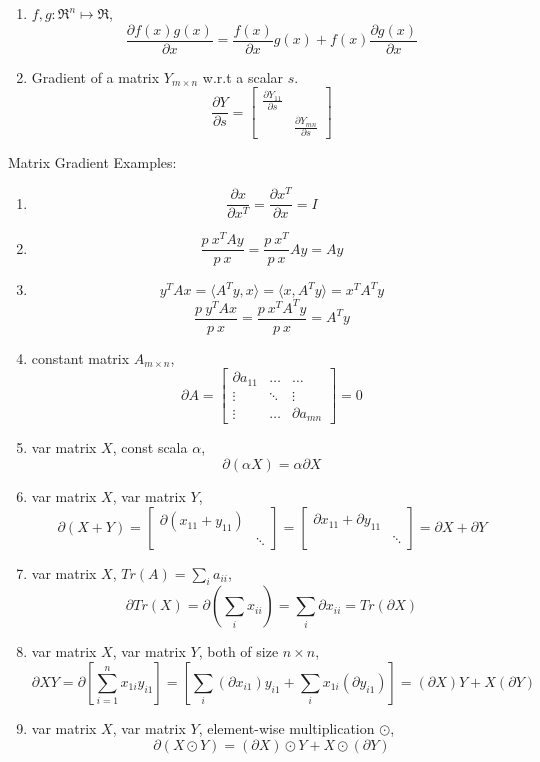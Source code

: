 
 \begin{enumerate}
	\item $f,g: \Re^n \mapsto \Re$,
		$$\frac{\partial f(x)g(x)}{\partial x}=
		 \frac{f(x)}{\partial x}g(x) + f(x)\frac{\partial g(x)}{\partial x}$$
	\item Gradient of a matrix $Y_{m\times n}$ w.r.t a scalar $s$.
$$\frac{\partial Y}{\partial s} =
		 \begin{bmatrix} \frac{\partial Y_{11}}{\partial s} & \\ & \frac{\partial Y_{mn}}{\partial s} \end{bmatrix}$$
 \end{enumerate}

 Matrix Gradient Examples:
 \begin{enumerate}
	 \item $$\frac{\partial x}{\partial x^T} =
		 \frac{\partial x^T}{\partial x} = I$$
	 \item $$\frac{p~x^TAy}{p~x} = \frac{p~x^T}{p~x}Ay = Ay$$
	 \item $$y^TAx = \langle A^Ty,x \rangle =
		 \langle x,A^Ty \rangle = x^TA^Ty$$
		 $$\frac{p~y^TAx}{p~x} = \frac{p~x^TA^Ty}{p~x} = A^Ty$$
	\item constant matrix $A_{m\times n}$,
		$$\partial A = \begin{bmatrix}
			\partial a_{11} & \ldots & \ldots \\
			\vdots & \ddots & \vdots \\
			\vdots & \ldots & \partial a_{mn}
		\end{bmatrix} = 0$$
	\item var matrix $X$, const scala $\alpha$,
		$$ \partial(\alpha X) = \alpha \partial X$$
	\item var matrix $X$, var matrix $Y$,
		$$ \partial(X+Y) =
			\begin{bmatrix} \partial(x_{11}+y_{11}) & \\
				& \ddots \end{bmatrix} = 
			\begin{bmatrix} \partial x_{11} + \partial y_{11} & \\
				& \ddots \end{bmatrix}
				= \partial X + \partial Y$$
	\item var matrix $X$, $Tr(A) = \sum_i a_{ii}$,
		$$ \partial Tr(X) = \partial (\sum_i x_{ii}) =
			\sum_i \partial x_{ii} = Tr(\partial X) $$
	\item var matrix $X$, var matrix $Y$, both of size $n\times n$,
		$$ \partial XY = \partial [ \sum_{i=1}^n x_{1i}y_{i1} ]
			= [ \sum_i (\partial x_{i1})y_{i1} + 
				\sum_i x_{1i}(\partial y_{i1}) ]
			= (\partial X)Y + X(\partial Y) $$
	\item var matrix $X$, var matrix $Y$, element-wise multiplication $\odot$,
		$$ \partial (X\odot Y) = (\partial X)\odot Y + X\odot (\partial Y)$$

 \end{enumerate}

